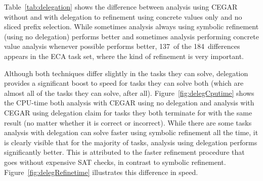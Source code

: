 Table~\ref{tab:delegation} shows the difference between analysis using CEGAR without and with delegation to refinement using concrete values only and no sliced prefix selection.
While sometimes analysis always using symbolic refinement (using no delegation) performs better and sometimes analysis performing concrete value analysis whenever possible performs better, 137~of the 184~differences appears in the ECA task set, where the kind of refinement is very important.

Although both techniques differ slightly in the tasks they can solve, delegation provides a significant boost to speed for tasks they can solve both (which are almost all of the tasks they can solve, after all).
Figure~\ref{fig:delegCputime} shows the CPU-time both analysis with CEGAR using no delegation and analysis with CEGAR using delegation claim for tasks they both terminate for with the same result (no matter whether it is correct or incorrect).
While there are some tasks analysis with delegation can solve faster using symbolic refinement all the time, it is clearly visible that for the majority of tasks, analysis using delegation performs significantly better.
This is attributed to the faster refinement procedure that goes without expensive SAT checks, in contrast to symbolic refinement.
Figure~\ref{fig:delegRefinetime} illustrates this difference in speed.

